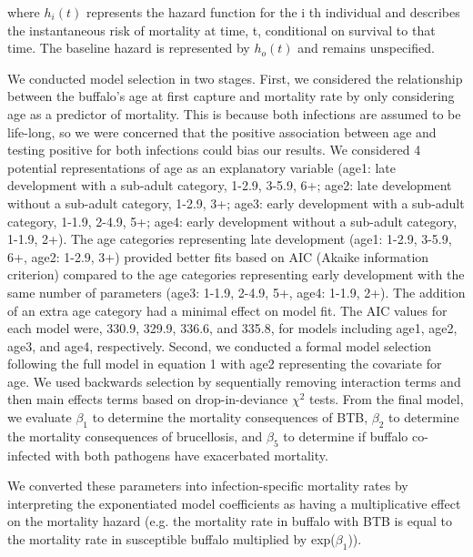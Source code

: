 \documentclass[10pt,letterpaper]{article}
\begin{document}
where $h_{i}(t)$ represents the hazard function for the i th individual and describes the instantaneous risk of mortality at time, t, conditional on survival to that time. The baseline hazard is represented by $h_{o}(t)$ and remains unspecified.  

We conducted model selection in two stages. First, we considered the relationship between the buffalo's age at first capture and mortality rate by only considering age as a predictor of mortality. This is because both infections are assumed to be life-long, so we were concerned that the positive association between age and testing positive for both infections could bias our results. We considered 4 potential representations of age as an explanatory variable (age1: late development with a sub-adult category, 1-2.9, 3-5.9, 6+; age2: late development without a sub-adult category, 1-2.9, 3+; age3: early development with a sub-adult category, 1-1.9, 2-4.9, 5+; age4: early development without a sub-adult category, 1-1.9, 2+). The age categories representing late development (age1: 1-2.9, 3-5.9, 6+, age2: 1-2.9, 3+) provided better fits based on AIC (Akaike information criterion) compared to the age categories representing early development with the same number of parameters (age3: 1-1.9, 2-4.9, 5+, age4: 1-1.9, 2+). The addition of an extra age category had a minimal effect on model fit. The AIC values for each model were, 330.9, 329.9, 336.6, and 335.8, for models including age1, age2, age3, and age4, respectively. Second, we conducted a formal model selection following the full model in equation 1 with age2 representing the covariate for age. We used backwards selection by sequentially removing interaction terms and then main effects terms based on drop-in-deviance $\chi^2$ tests. From the final model, we evaluate $\beta_1$ to determine the mortality consequences of BTB, $\beta_2$ to determine the mortality consequences of brucellosis, and $\beta_5$ to determine if buffalo co-infected with both pathogens have exacerbated mortality.

We converted these parameters into infection-specific mortality rates by interpreting the exponentiated model coefficients as having a multiplicative effect on the mortality hazard (e.g. the mortality rate in buffalo with BTB is equal to the mortality rate in susceptible buffalo multiplied by exp($\beta_1$)).  \\
\end{document}
